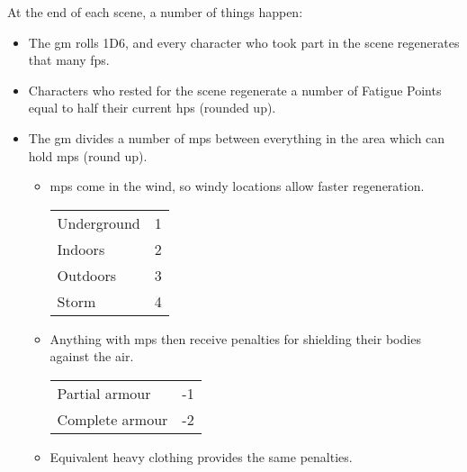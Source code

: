 
At the end of each scene, a number of things happen:

\begin{itemize}
  \item
  The \gls{gm} rolls 1D6, and every character who took part in the scene regenerates that many \glspl{fp}.
  \item
  Characters who rested for the scene regenerate a number of Fatigue Points equal to half their current \glspl{hp} (rounded up).
  \item
  The \gls{gm} divides a number of \glspl{mp} between everything in the area which can hold \glspl{mp} (round up).
  \begin{itemize}
    \item
    \Glspl{mp} come in the wind, so windy locations allow faster regeneration.

    \begin{tabularx}{\linewidth}{Xc}
    \hline
    Underground & 1 \\
    Indoors     & 2 \\
    Outdoors    & 3 \\
    Storm       & 4 \\
    \hline
    \end{tabularx}
    \item
    Anything with \glspl{mp} then receive penalties for shielding their bodies against the air.

    \begin{tabularx}{\linewidth}{Xc}
    \hline
    Partial armour  & -1 \\
    Complete armour & -2 \\
    \hline
    \end{tabularx}
    \item
    Equivalent heavy clothing provides the same penalties.
  \end{itemize}
\end{itemize}
